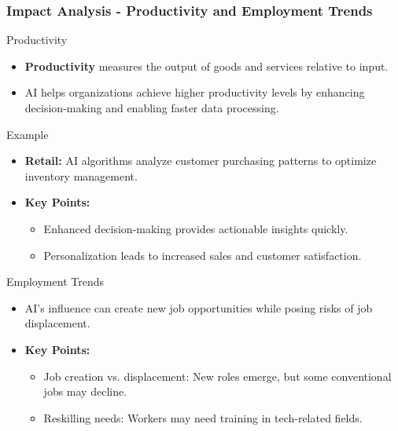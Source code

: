 \documentclass{beamer}
\begin{document}
\begin{frame}[fragile]
    \frametitle{Impact Analysis - Productivity and Employment Trends}
    \begin{block}{Productivity}
        \begin{itemize}
            \item \textbf{Productivity} measures the output of goods and services relative to input.
            \item AI helps organizations achieve higher productivity levels by enhancing decision-making and enabling faster data processing.
        \end{itemize}
    \end{block}
    
    \begin{block}{Example}
        \begin{itemize}
            \item \textbf{Retail:} AI algorithms analyze customer purchasing patterns to optimize inventory management.
        \end{itemize}
    \end{block}
    
    \begin{itemize}
        \item \textbf{Key Points:}
        \begin{itemize}
            \item Enhanced decision-making provides actionable insights quickly.
            \item Personalization leads to increased sales and customer satisfaction.
        \end{itemize}
    \end{itemize}
    
    \begin{block}{Employment Trends}
        \begin{itemize}
            \item AI's influence can create new job opportunities while posing risks of job displacement.
        \end{itemize}
    \end{block}
    
    \begin{itemize}
        \item \textbf{Key Points:}
        \begin{itemize}
            \item Job creation vs. displacement: New roles emerge, but some conventional jobs may decline.
            \item Reskilling needs: Workers may need training in tech-related fields.
        \end{itemize}
    \end{itemize}
\end{frame}
\end{document}
